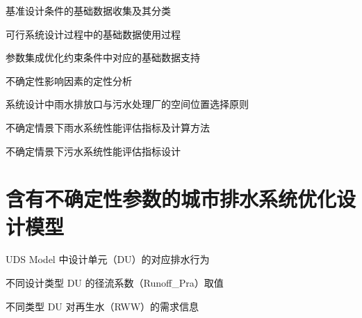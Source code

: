 \documentclass[degree=doctor]{sysuthesis}
\begin{document}
\clearpage
\setcounter{page}{46}
\begin{table}
  \centering
  \caption{基准设计条件的基础数据收集及其分类}
\end{table}

\clearpage
\setcounter{page}{47}
\begin{table}
  \centering
  \caption{可行系统设计过程中的基础数据使用过程}
\end{table}

\clearpage
\setcounter{page}{48}
\begin{table}
  \centering
  \caption{参数集成优化约束条件中对应的基础数据支持}
\end{table}

\clearpage
\setcounter{page}{51}
\begin{table}
  \centering
  \caption{不确定性影响因素的定性分析}
\end{table}

\clearpage
\setcounter{page}{55}
\begin{table}
  \centering
  \caption{系统设计中雨水排放口与污水处理厂的空间位置选择原则}
\end{table}

\clearpage
\setcounter{page}{60}
\begin{table}
  \centering
  \caption{不确定情景下雨水系统性能评估指标及计算方法}
\end{table}

\clearpage
\setcounter{page}{62}
\begin{table}
  \centering
  \caption{不确定情景下污水系统性能评估指标设计}
\end{table}


\chapter{含有不确定性参数的城市排水系统优化设计模型}

\clearpage
\setcounter{page}{68}
\begin{table}
  \centering
  \caption{UDS Model 中设计单元（DU）的对应排水行为}
\end{table}

\clearpage
\setcounter{page}{70}
\begin{table}
  \centering
  \caption{不同设计类型 DU 的径流系数（Runoff\_Pra）取值}
\end{table}

\clearpage
\setcounter{page}{72}
\begin{table}
  \centering
  \caption{不同类型 DU 对再生水（RWW）的需求信息}
\end{table}
\end{document}

